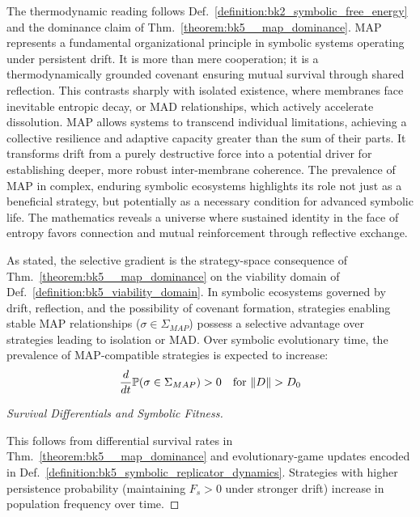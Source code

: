 \begin{scholium} \label{scholium:bk5_map_as_fundamental_organizational_principle}
The thermodynamic reading follows Def.~\ref{definition:bk2_symbolic_free_energy} and the dominance claim of Thm.~\ref{theorem:bk5__map_dominance}.
MAP represents a fundamental organizational principle in symbolic systems operating under persistent drift. It is more than mere cooperation; it is a thermodynamically grounded covenant ensuring mutual survival through shared reflection. This contrasts sharply with isolated existence, where membranes face inevitable entropic decay, or MAD relationships, which actively accelerate dissolution. MAP allows systems to transcend individual limitations, achieving a collective resilience and adaptive capacity greater than the sum of their parts. It transforms drift from a purely destructive force into a potential driver for establishing deeper, more robust inter-membrane coherence. The prevalence of MAP in complex, enduring symbolic ecosystems highlights its role not just as a beneficial strategy, but potentially as a necessary condition for advanced symbolic life. The mathematics reveals a universe where sustained identity in the face of entropy favors connection and mutual reinforcement through reflective exchange.
\end{scholium}
\begin{corollary} \label{corollary:bk5_map_evolutionary_advantag}
As stated, the selective gradient is the strategy-space consequence of Thm.~\ref{theorem:bk5__map_dominance} on the viability domain of Def.~\ref{definition:bk5_viability_domain}.
In symbolic ecosystems governed by drift, reflection, and the possibility of covenant formation, strategies enabling stable MAP relationships ($\sigma \in \Sigma_{MAP}$) possess a selective advantage over strategies leading to isolation or MAD. Over symbolic evolutionary time, the prevalence of MAP-compatible strategies is expected to increase:
\begin{equation}
\frac{d}{dt} \mathbb{P}(\sigma \in \Sigma_{MAP}) > 0 \quad \text{for } \|D\| > D_0
\end{equation}
\end{corollary}
\begin{proof}[Survival Differentials and Symbolic Fitness]
\label{proof:bk5_symbolic_fitness_differentials}
\leavevmode

This follows from differential survival rates in
Thm.~\ref{theorem:bk5__map_dominance} and evolutionary-game updates encoded in
Def.~\ref{definition:bk5_symbolic_replicator_dynamics}.
Strategies with higher persistence probability
(maintaining $F_s > 0$ under stronger drift) increase in population frequency
over time.
\end{proof}
